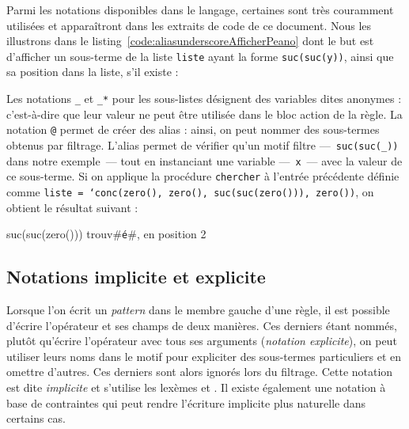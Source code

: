 Parmi les notations disponibles dans le langage, certaines sont très couramment
utilisées et apparaîtront dans les extraits de code de ce document. Nous les
illustrons dans le 
listing~\ref{code:aliasunderscoreAfficherPeano} dont le but est d'afficher un
sous-terme de la liste \texttt{liste} ayant la forme \texttt{suc(suc(y))},
ainsi que sa position dans la liste, s'il existe :



Les notations \texttt{\_} et \texttt{\_*} pour les sous-listes désignent des
variables dites anonymes : c'est-à-dire que leur valeur ne peut être utilisée
dans le bloc action de la règle.  La notation \texttt{@} permet de créer des
alias : ainsi, on peut nommer des sous-termes obtenus par filtrage. L'alias
permet de vérifier qu'un motif filtre ---~\texttt{suc(suc(\_))} dans notre
exemple~--- tout en instanciant une variable ---~\texttt{x}~--- avec la valeur
de ce sous-terme. Si on applique la procédure \texttt{chercher} à l'entrée
précédente définie comme \texttt{liste = `conc(zero(), zero(),
suc(suc(zero())), zero())}, on obtient le résultat suivant :
\begin{tomcode4}
  suc(suc(zero())) trouv#\texttt{é}#, en position 2
\end{tomcode4}


\subsection{Notations implicite et explicite}

Lorsque l’on écrit un \emph{pattern} dans le membre gauche d'une règle, il est
possible d'écrire l'opérateur et ses champs de deux manières. %
Ces derniers étant nommés, plutôt qu'écrire l'opérateur avec tous ses arguments
(\emph{notation explicite}), on peut utiliser leurs noms dans le motif pour
expliciter des sous-termes particuliers et en omettre d'autres. Ces derniers
sont alors ignorés lors du filtrage. Cette notation est dite \emph{implicite}
et s'utilise {\via} les lexèmes \lex{[} et \lex{]}. Il existe également une
notation à base de contraintes qui peut rendre l'écriture implicite plus
naturelle dans certains cas.

